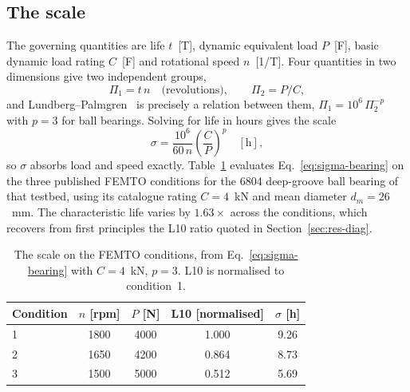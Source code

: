 \subsection*{The scale}
The governing quantities are life $t$~[T], dynamic equivalent load $P$~[F], basic dynamic load
rating $C$~[F] and rotational speed $n$~[1/T]. Four quantities in two dimensions give two
independent groups,
\[
\Pi_1=t\,n \quad\text{(revolutions)},\qquad \Pi_2=P/C,
\]
and Lundberg--Palmgren~\cite{lundberg1947dynamic,iso281} is precisely a relation between them,
$\Pi_1=10^{6}\,\Pi_2^{-p}$ with $p=3$ for ball bearings. Solving for life in hours gives the scale
\begin{equation}\label{eq:sigma-bearing}
\sigma=\frac{10^{6}}{60\,n}\left(\frac{C}{P}\right)^{p}\quad[\text{h}],
\end{equation}
so $\sigma$ absorbs load and speed exactly. Table~\ref{tab:bearing-sigma} evaluates
Eq.~\eqref{eq:sigma-bearing} on the three published FEMTO conditions for the 6804 deep-groove ball
bearing of that testbed, using its catalogue rating $C=4$~kN and mean diameter $d_m=26$~mm. The
characteristic life varies by $1.63\times$ across the conditions, which recovers from first
principles the L10 ratio quoted in Section~\ref{sec:res-diag}.

\begin{table}[h]\centering\footnotesize
\setlength{\tabcolsep}{10pt}\renewcommand{\arraystretch}{1.2}
\caption{The scale on the FEMTO conditions, from Eq.~\eqref{eq:sigma-bearing} with $C=4$~kN,
$p=3$. L10 is normalised to condition~1.}\label{tab:bearing-sigma}
\begin{tabular}{@{}lcccc@{}}\toprule
Condition & $n$ [rpm] & $P$ [N] & L10 [normalised] & $\sigma$ [h] \\\midrule
1 & 1800 & 4000 & 1.000 & 9.26 \\
2 & 1650 & 4200 & 0.864 & 8.73 \\
3 & 1500 & 5000 & 0.512 & 5.69 \\\bottomrule
\end{tabular}
\end{table}


